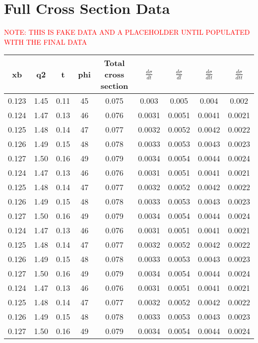 \chapter{Full Cross Section Data}\label{app:Across_sections}
\textcolor{red}{NOTE: THIS IS FAKE DATA AND A PLACEHOLDER UNTIL POPULATED WITH THE FINAL DATA}
    \begin{longtable}{|c|c|c|c|c|c|c|c|c|}
    \hline
    \textbf{xb} & \textbf{q2} & \textbf{t} & \textbf{phi} & \textbf{Total cross section} & $\frac{d\sigma}{dt}$ & $\frac{d\sigma}{dl}$ & $\frac{d\sigma}{dlt}$ & $\frac{d\sigma}{dtt}$ \\
    \hline
    \endhead
    0.123 & 1.45 & 0.11 & 45 & 0.075 & 0.003 & 0.005 & 0.004 & 0.002 \\
    0.124 & 1.47 & 0.13 & 46 & 0.076 & 0.0031 & 0.0051 & 0.0041 & 0.0021 \\
    0.125 & 1.48 & 0.14 & 47 & 0.077 & 0.0032 & 0.0052 & 0.0042 & 0.0022 \\
    0.126 & 1.49 & 0.15 & 48 & 0.078 & 0.0033 & 0.0053 & 0.0043 & 0.0023 \\
    0.127 & 1.50 & 0.16 & 49 & 0.079 & 0.0034 & 0.0054 & 0.0044 & 0.0024 \\
        0.124 & 1.47 & 0.13 & 46 & 0.076 & 0.0031 & 0.0051 & 0.0041 & 0.0021 \\
    0.125 & 1.48 & 0.14 & 47 & 0.077 & 0.0032 & 0.0052 & 0.0042 & 0.0022 \\
    0.126 & 1.49 & 0.15 & 48 & 0.078 & 0.0033 & 0.0053 & 0.0043 & 0.0023 \\
    0.127 & 1.50 & 0.16 & 49 & 0.079 & 0.0034 & 0.0054 & 0.0044 & 0.0024 \\
        0.124 & 1.47 & 0.13 & 46 & 0.076 & 0.0031 & 0.0051 & 0.0041 & 0.0021 \\
    0.125 & 1.48 & 0.14 & 47 & 0.077 & 0.0032 & 0.0052 & 0.0042 & 0.0022 \\
    0.126 & 1.49 & 0.15 & 48 & 0.078 & 0.0033 & 0.0053 & 0.0043 & 0.0023 \\
    0.127 & 1.50 & 0.16 & 49 & 0.079 & 0.0034 & 0.0054 & 0.0044 & 0.0024 \\
        0.124 & 1.47 & 0.13 & 46 & 0.076 & 0.0031 & 0.0051 & 0.0041 & 0.0021 \\
    0.125 & 1.48 & 0.14 & 47 & 0.077 & 0.0032 & 0.0052 & 0.0042 & 0.0022 \\
    0.126 & 1.49 & 0.15 & 48 & 0.078 & 0.0033 & 0.0053 & 0.0043 & 0.0023 \\
    0.127 & 1.50 & 0.16 & 49 & 0.079 & 0.0034 & 0.0054 & 0.0044 & 0.0024 \\

\end{longtable}
